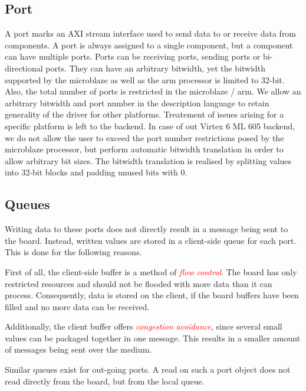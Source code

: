 \documentclass{report}
\begin{document}
\subsection{Port}
 A port marks an AXI stream interface used to send data to or receive data from components. A port is always assigned to a single component, but a component can have multiple ports. Ports can be receiving ports, sending ports or bi-directional ports. They can have an arbitrary bitwidth, yet the bitwidth supported by the microblaze as well as the arm processor is limited to 32-bit. Also, the total number of ports is restricted in the microblaze / arm. We allow an arbitrary bitwidth and port number in the description language to retain generality of the driver for other platforms. Treatement of issues arising for a specific platform is left to the backend. In case of out Virtex 6 ML 605 backend, we do not allow the user to exceed the port number restrictions posed by the microblaze processor, but perform automatic bitwidth translation in order to allow arbitrary bit sizes. The bitwidth translation is realised by splitting values into 32-bit blocks and padding unused bits with 0.
\subsection{Queues}
Writing data to these ports does not directly result in a message being sent to the board. Instead, written values are stored in a client-side queue for each port. This is done for the following reasons.

First of all, the client-side buffer is a method of \textcolor{red}{\textit{flow control}}. The board has only restricted resources and should not be flooded with more data than it can process. Consequently, data is stored on the client, if the board buffers have been filled and no more data can be received. 

Additionally, the client buffer offers \textcolor{red}{\textit{congestion avoidance}}, since several small values can be packaged together in one message. This results in a smaller amount of messages being sent over the medium.

Similar queues exist for out-going ports. A read on such a port object does not read directly from the board, but from the local queue.
\end{document}
